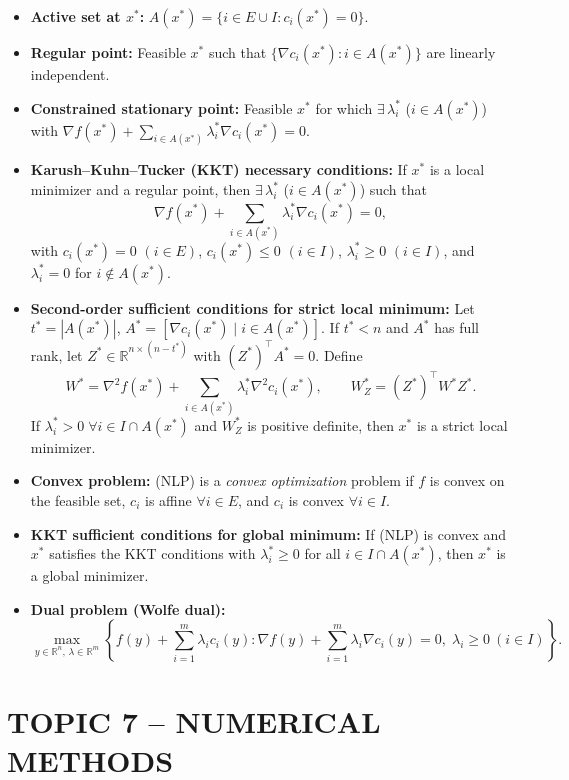 \documentclass[12pt]{article}
\begin{document}
\begin{itemize}
  \item \textbf{Active set at $x^*$:} $A(x^*) = \{ i\in E\cup I : c_i(x^*) = 0 \}.$
  \item \textbf{Regular point:} Feasible $x^*$ such that $\{\nabla c_i(x^*) : i\in A(x^*)\}$ are linearly independent.
  \item \textbf{Constrained stationary point:} Feasible $x^*$ for which $\exists\, \lambda_i^*$ ($i\in A(x^*)$) with
  $\displaystyle \nabla f(x^*) + \sum_{i\in A(x^*)} \lambda_i^* \nabla c_i(x^*) = 0$.
  \item \textbf{Karush--Kuhn--Tucker (KKT) necessary conditions:} If $x^*$ is a local minimizer and a regular point, then $\exists\, \lambda_i^*$ ($i\in A(x^*)$) such that
  \[
    \nabla f(x^*) + \sum_{i\in A(x^*)} \lambda_i^* \nabla c_i(x^*) = 0,
  \]
  with $c_i(x^*)=0$ $(i\in E)$, $c_i(x^*)\le 0$ $(i\in I)$, $\lambda_i^*\ge 0$ $(i\in I)$, and $\lambda_i^*=0$ for $i\notin A(x^*)$.
  \item \textbf{Second-order sufficient conditions for strict local minimum:} Let $t^*=|A(x^*)|$, $A^*=[\nabla c_i(x^*)\mid i\in A(x^*)]$. If $t^*<n$ and $A^*$ has full rank, let $Z^*\in\mathbb{R}^{n\times(n-t^*)}$ with $(Z^*)^{\top}A^*=0$. Define
  \[
    W^* = \nabla^2 f(x^*) + \sum_{i\in A(x^*)} \lambda_i^*\nabla^2 c_i(x^*), \qquad W_Z^* = (Z^*)^{\top} W^* Z^*.
  \]
  If $\lambda_i^*>0\;\forall i\in I\cap A(x^*)$ and $W_Z^*$ is positive definite, then $x^*$ is a strict local minimizer.
  \item \textbf{Convex problem:} (NLP) is a \emph{convex optimization} problem if $f$ is convex on the feasible set, $c_i$ is affine $\forall i\in E$, and $c_i$ is convex $\forall i\in I$.
  \item \textbf{KKT sufficient conditions for global minimum:} If (NLP) is convex and $x^*$ satisfies the KKT conditions with $\lambda_i^*\ge 0$ for all $i\in I\cap A(x^*)$, then $x^*$ is a global minimizer.
  \item \textbf{Dual problem (Wolfe dual):}
  \begin{equation*}
    \max_{y\in\mathbb{R}^n,\,\lambda\in\mathbb{R}^m} \left\{ f(y) + \sum_{i=1}^m \lambda_i c_i(y) : \nabla f(y) + \sum_{i=1}^m \lambda_i \nabla c_i(y) = 0,\; \lambda_i\ge 0\ (i\in I) \right\}. \tag{D}
  \end{equation*}
\end{itemize}

\bigskip
\section*{TOPIC 7 -- NUMERICAL METHODS}
\end{document}
